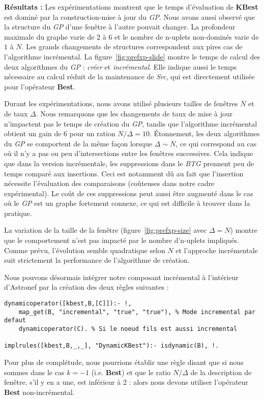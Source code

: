 \textbf{Résultats :} Les expérimentations montrent que le temps d'évaluation de \textbf{KBest} est dominé par la construction-mise à jour du \textit{GP}. Nous avons aussi observé que la structure du \textit{GP} d'une fenêtre à l'autre pouvait changer. La profondeur maximale du graphe varie de 2 à 6 et le nombre de n-uplets non-dominés varie de $1$ à $N$. Les grands changements de structures correspondent aux pires cas de l'algorithme incrémental. La figure~\ref{fig:prefxp-slide} montre le temps de calcul des deux algorithmes du \textit{GP} : \textit{créer} et \textit{incrémental}. Elle indique aussi le temps nécessaire au calcul réduit de la maintenance de \textit{Src}, qui est directement utilisée pour l'opérateur \textbf{Best}. 

Durant les expérimentations, nous avons utilisé plusieurs tailles de fenêtres $N$ et de taux $\Delta$. Nous remarquons que les changements de taux de mise à jour n'impactent pas le temps de création du \textit{GP}, tandis que l'algorithme incrémental obtient un gain de 6 pour un ration $N/\Delta=10$. Étonnement, les deux algorithmes du \textit{GP} se comportent de la même façon lorsque $\Delta\sim N$, ce qui correspond au cas où il n'y a pas ou peu d'intersections entre les fenêtres successives. Cela indique que dans la version incrémentale, les suppressions dans le \textit{BTG} prennent peu de temps comparé aux insertions. Ceci est notamment dû au fait que l'insertion nécessite l'évaluation des comparaisons (coûteuses dans notre cadre expérimental). Le coût de ces suppressions peut aussi être augmenté dans le cas où le \textit{GP} est un graphe fortement connexe, ce qui est difficile à trouver dans la pratique.

La variation de la taille de la fenêtre (figure~\ref{fig:prefxp-size} avec $\Delta=N$) montre que le comportement n'est pas impacté par le nombre d'n-uplets impliqués. Comme prévu, l'évolution semble quadratique selon $N$ et l'approche incrémentale suit strictement la performance de l'algorithme de création.

Nous pouvons désormais intégrer notre composant incrémental à l'intérieur d'Astronef par la création des deux règles suivantes :
\begin{lstlisting}[language=PrologAstral]
dynamicoperator([kbest,B,[C]]):- !,
    map_get(B, "incremental", "true", "true"), % Mode incremental par defaut
    dynamicoperator(C). % Si le noeud fils est aussi incremental

implrules([kbest,B,_,_], "DynamicKBest"):- isdynamic(B), !.
\end{lstlisting}
Pour plus de complétude, nous pourrions établir une règle disant que si nous sommes dans le cas $k=-1$ (i.e. \textbf{Best}) et que le ratio $N/\Delta$ de la description de fenêtre, s'il y en a une, est inférieur à 2 : alors nous devons utiliser l'opérateur \textbf{Best} non-incrémental.
